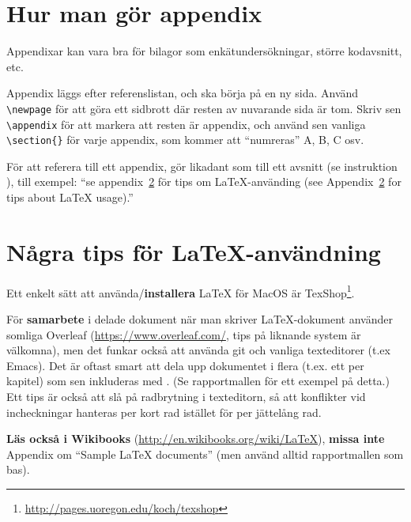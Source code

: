 
\section{Hur man gör appendix}
\label{app:appendix}
Appendixar kan vara bra för bilagor som enkätundersökningar, större kodavsnitt, etc. 

Appendix läggs efter referenslistan, och ska börja på en ny sida. Använd \verb|\newpage| för att göra ett sidbrott där resten av nuvarande sida är tom. Skriv sen \verb|\appendix| för att markera att resten är appendix, och 
 använd sen vanliga \verb|\section{}| för varje appendix, som kommer att ``numreras'' A, B, C osv.

För att referera till ett appendix, gör likadant som till ett avsnitt (se instruktion ), till exempel: ``se appendix~\ref{app:latex} för tips om La\TeX-använding (see Appendix~\ref{app:latex} for tips about La\TeX{} usage).''

\section{Några tips för La\TeX-användning}
\label{app:latex}

Ett enkelt sätt att använda/\textbf{installera} LaTeX för MacOS är TexShop\footnote{\url{http://pages.uoregon.edu/koch/texshop}}.

För \textbf{samarbete} i delade dokument när man skriver La\TeX-dokument använder somliga Overleaf (\url{https://www.overleaf.com/}, tips på liknande system är välkomna), men det funkar också att använda git och vanliga texteditorer (t.ex Emacs). 
Det är oftast smart att dela upp dokumentet i flera (t.ex. ett per kapitel) som sen inkluderas med \verb||. (Se rapportmallen för ett exempel på detta.)
Ett tips är också att slå på radbrytning i texteditorn, så att konflikter vid incheckningar hanteras per kort rad istället för per jättelång rad.

\textbf{Läs också i Wikibooks} (\url{http://en.wikibooks.org/wiki/LaTeX}), \textbf{missa inte} Appendix om ``Sample LaTeX documents'' (men använd alltid rapportmallen som bas).

